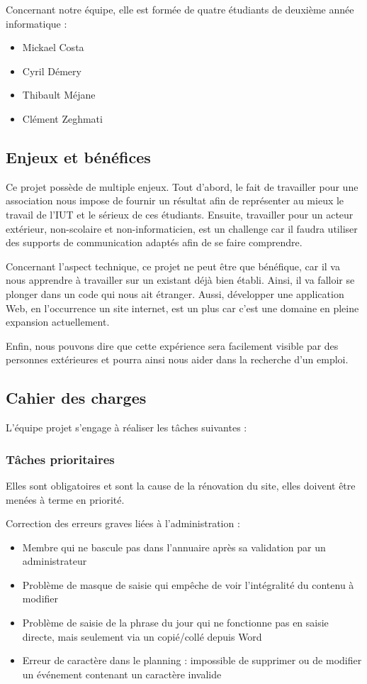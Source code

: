 \documentclass[11pt]{report}
\begin{document}
\par Concernant notre équipe, elle est formée de quatre étudiants de deuxième 
année informatique : 
\begin{itemize}
    \item Mickael Costa
    \item Cyril Démery
    \item Thibault Méjane
    \item Clément Zeghmati
\end{itemize}


\subsection{Enjeux et bénéfices}
Ce projet possède de multiple enjeux. Tout d'abord, le fait de travailler pour 
une association nous impose de fournir un résultat afin de représenter au mieux 
le travail de l'IUT et le sérieux de ces étudiants. Ensuite, travailler pour 
un acteur extérieur, non-scolaire et non-informaticien, est un challenge car il 
faudra utiliser des supports de communication adaptés afin de se faire 
comprendre. \\

\par Concernant l'aspect technique, ce projet ne peut être que bénéfique, car 
il 
va nous apprendre à travailler sur un existant déjà bien établi. Ainsi, il va 
falloir se plonger dans un code qui nous ait étranger. Aussi, développer une 
application Web, en l’occurrence un site internet, est un plus car c'est une 
domaine en pleine expansion actuellement.\\

\par Enfin, nous pouvons dire que cette expérience sera facilement visible par 
des personnes extérieures et pourra ainsi nous aider dans la recherche d'un 
emploi.
\subsection{Cahier des charges}
L'équipe projet s'engage à réaliser les tâches suivantes :
\subsubsection*{Tâches prioritaires}
Elles sont obligatoires et sont la cause de la rénovation du site, elles doivent être menées à terme en priorité. 

Correction des erreurs graves liées à l'administration :
\begin{itemize}
\item Membre qui ne bascule pas dans l'annuaire après sa validation par un
administrateur
\item Problème de masque de saisie qui empêche de voir l'intégralité du contenu
à modifier 
\item Problème de saisie de la phrase du jour qui ne fonctionne pas en saisie
directe, mais seulement via un copié/collé depuis Word
\item Erreur de caractère dans le planning : impossible de supprimer ou de
modifier un événement contenant un caractère invalide
\end{itemize}
\end{document}
